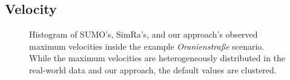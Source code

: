 \subsection{Velocity}
\label{subsec:velocity_evaluation}
\begin{figure}
    \centering
    \hfill
    \caption{%
        Histogram of SUMO's, SimRa's, and our approach's observed maximum velocities inside the example \textit{Oranienstraße} scenario.
        While the maximum velocities are heterogeneously distributed in the real-world data and our approach, the default values are clustered.
    }%
    \label{fig:eval_velo}
\end{figure}

